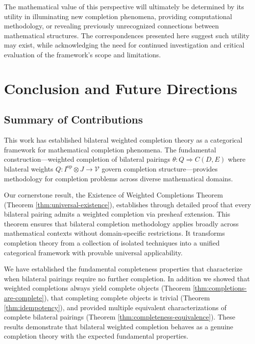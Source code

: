 \documentclass[11pt]{article}
\theoremstyle{plain}
\theoremstyle{definition}
\theoremstyle{remark}
\newcommand{\V}{\mathcal{V}}
\newcommand{\op}{\mathrm{op}}
\begin{document}
The mathematical value of this perspective will ultimately be determined by its utility in illuminating new completion phenomena, providing computational methodology, or revealing previously unrecognized connections between mathematical structures. The correspondences presented here suggest such utility may exist, while acknowledging the need for continued investigation and critical evaluation of the framework's scope and limitations.

\section{Conclusion and Future Directions}

\subsection{Summary of Contributions}

This work has established bilateral weighted completion theory as a categorical framework for mathematical completion phenomena. The fundamental construction---weighted completion of bilateral pairings $\theta : Q \Rightarrow C(D,E)$ where bilateral weights $Q : I^{\op} \otimes J \to \V$ govern completion structure---provides methodology for completion problems across diverse mathematical domains.

Our cornerstone result, the Existence of Weighted Completions Theorem (Theorem \ref{thm:universal-existence}), establishes through detailed proof that every bilateral pairing admits a weighted completion via presheaf extension. This theorem ensures that bilateral completion methodology applies broadly across mathematical contexts without domain-specific restrictions. It transforms completion theory from a collection of isolated techniques into a unified categorical framework with provable universal applicability.

We have established the fundamental completeness properties that characterize when bilateral pairings require no further completion. In addition we showed that weighted completions always yield complete objects (Theorem \ref{thm:completions-are-complete}), that completing complete objects is trivial (Theorem \ref{thm:idempotency}), and provided multiple equivalent characterizations of complete bilateral pairings (Theorem \ref{thm:completeness-equivalence}). These results demonstrate that bilateral weighted completion behaves as a genuine completion theory with the expected fundamental properties.
\end{document}

